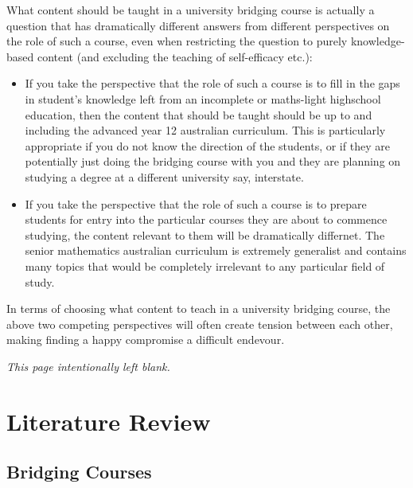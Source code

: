 \documentclass[twoside,12pt,a4paper]{report}
\makeatletter
\newcommand*{\intentionallyblankpage}{
  \vspace*{\fill}
  {\centering \textit{This page intentionally left blank.} \par}
  \vspace{\fill}}
\renewcommand*{\cleardoublepage}{\clearpage\if@twoside \ifodd\c@page\else
  \intentionallyblankpage
  \newpage
  \if@twocolumn\hbox{}\newpage\fi\fi\fi}
\makeatother
\begin{document}
What content should be taught in a university bridging course is actually a question that has dramatically different answers from different perspectives on the role of such a course, even when restricting the question to purely knowledge-based content (and excluding the teaching of self-efficacy etc.):
\begin{itemize}
	\item If you take the perspective that the role of such a course is to fill in the gaps in student's knowledge left from an incomplete or maths-light highschool education, then the content that should be taught should be up to and including the advanced year 12 australian curriculum. This is particularly appropriate if you do not know the direction of the students, or if they are potentially just doing the bridging course with you and they are planning on studying a degree at a different university say, interstate.
	\item If you take the perspective that the role of such a course is to prepare students for entry into the particular courses they are about to commence studying, the content relevant to them will be dramatically differnet. The senior mathematics australian curriculum is extremely generalist and contains many topics that would be completely irrelevant to any particular field of study. 
\end{itemize}
In terms of choosing what content to teach in a university bridging course, the above two competing perspectives will often create tension between each other, making finding a happy compromise a difficult endevour. 


\cleardoublepage
\chapter{Literature Review}
\label{chap:literature}


\section{Bridging Courses}
\end{document}
